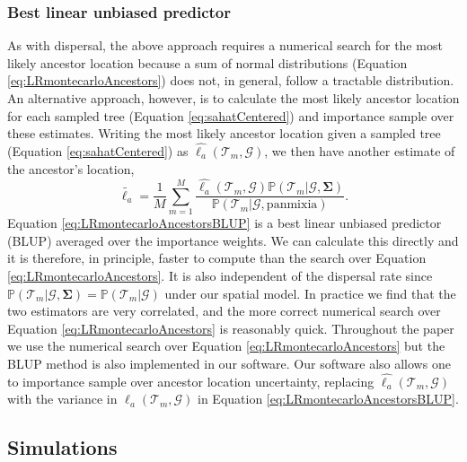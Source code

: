 \documentclass[12pt]{article}
\begin{document}
\subsubsection*{Best linear unbiased predictor}

As with dispersal, the above approach requires a numerical search for the most likely ancestor location because a sum of normal distributions (Equation \eqref{eq:LRmontecarloAncestors}) does not, in general, follow a tractable distribution.
An alternative approach, however, is to calculate the most likely ancestor location for each sampled tree (Equation \eqref{eq:sahatCentered}) and importance sample over these estimates.
Writing the most likely ancestor location given a sampled tree (Equation \ref{eq:sahatCentered}) as $\widehat{\bm{\ell}_a}(\mathcal{T}_m, \mathcal{G})$, we then have another estimate of the ancestor's location,
\begin{equation}\label{eq:LRmontecarloAncestorsBLUP}
\tilde{\bm{\ell}_a} = \frac{1}{M} \sum_{m=1}^{M} \frac{ \widehat{\bm{\ell}_a}(\mathcal{T}_m, \mathcal{G}) \mathbb{P}(\mathcal{T}_m | \mathcal{G}, \mathbf{\Sigma})}{\mathbb{P}(\mathcal{T}_m | \mathcal{G},\mathrm{panmixia})}.
\end{equation}
Equation \eqref{eq:LRmontecarloAncestorsBLUP} is a best linear unbiased predictor (BLUP) averaged over the importance weights. 
We can calculate this directly and it is therefore, in principle, faster to compute than the search over Equation \eqref{eq:LRmontecarloAncestors}. 
It is also independent of the dispersal rate since $\mathbb{P}(\mathcal{T}_m | \mathcal{G}, \mathbf{\Sigma})=\mathbb{P}(\mathcal{T}_m | \mathcal{G})$ under our spatial model.
In practice we find that the two estimators are very correlated, and the more correct numerical search over Equation \eqref{eq:LRmontecarloAncestors} is reasonably quick. 
Throughout the paper we use the numerical search over Equation \eqref{eq:LRmontecarloAncestors} but the BLUP method is also implemented in our software.
Our software also allows one to importance sample over ancestor location uncertainty, replacing $\widehat{\bm{\ell}_a}(\mathcal{T}_m, \mathcal{G})$ with the variance in $\bm{\ell}_a(\mathcal{T}_m, \mathcal{G})$ in Equation \eqref{eq:LRmontecarloAncestorsBLUP}.

\subsection*{Simulations}
\end{document}
